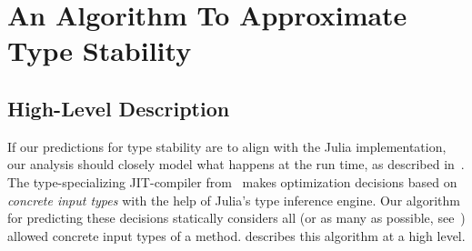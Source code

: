 \section{An Algorithm To Approximate Type Stability}%
\label{sec:algo}

\subsection{High-Level Description}
\label{ssec:algo:high}

If our predictions for type stability are to align with the Julia
implementation, our analysis should closely model what happens at the run time,
as described in~. The type-specializing JIT-compiler
from~ makes optimization decisions based on \emph{concrete
  input types} with the help of Julia's type inference engine. Our algorithm for
predicting these decisions statically considers all (or as many as possible,
see~) allowed concrete input types of a method.
 describes this algorithm at a high level.



